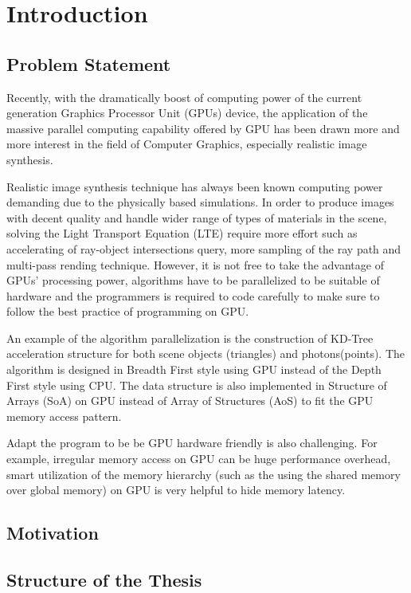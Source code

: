 \chapter{Introduction}

\section{Problem Statement}

Recently, with the dramatically boost of computing power of the current generation Graphics Processor Unit (GPUs) device, the application of the massive parallel computing capability offered by GPU has been drawn more and more interest in the field of Computer Graphics, especially realistic image synthesis.  

Realistic image synthesis technique has always been known computing power demanding due to the physically based simulations. In order to produce images with decent quality and handle wider range of types of materials in the scene, solving the Light Transport  Equation (LTE) require more effort such as accelerating of ray-object intersections query, more sampling of the ray path and multi-pass rending technique. However, it is not free to take the advantage of GPUs' processing power, algorithms have to be parallelized to be suitable of hardware and the programmers is required to code carefully to make sure to follow the best practice of programming on GPU. 

An example of the algorithm parallelization is the construction of KD-Tree acceleration structure for both scene objects (triangles) and photons(points). The algorithm is designed in Breadth First style using GPU instead of the Depth First style using CPU. The data structure is also implemented in Structure of Arrays (SoA) on GPU instead of Array of Structures (AoS) to fit the GPU memory access pattern. 

Adapt the program to be be GPU hardware friendly is also challenging. For example, irregular memory access on GPU can be huge performance overhead, smart utilization of the memory hierarchy (such as the using the shared memory over global memory) on GPU is very helpful to hide memory latency. 


\section{Motivation}


\section{Structure of the Thesis}	

